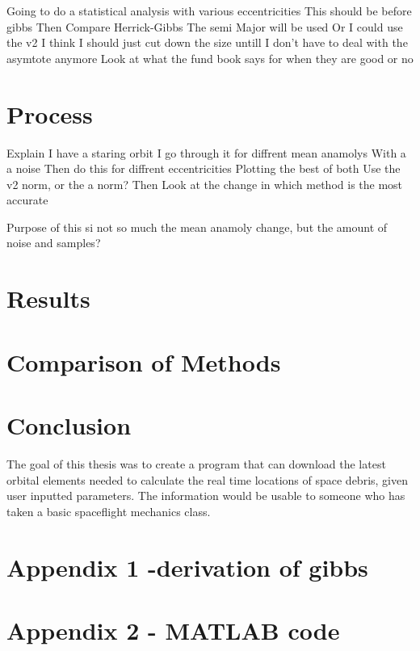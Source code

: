 \documentclass[12pt]{article}
\begin{document}
	
	Going to do a statistical analysis with various eccentricities
	This should be before gibbs
	Then Compare Herrick-Gibbs
	The semi Major will be used
	Or I could use the v2
	I think I should just cut down the size untill I don't have to deal with the asymtote anymore
	Look at what the fund book says for when they are good or no
	
	\section{Process}
	Explain I have a staring orbit
	I go through it for diffrent mean anamolys
	With a a noise
	Then do this for diffrent eccentricities
	Plotting the best of both
	Use the v2 norm, or the a norm?
	Then Look at the change in which method is the most accurate
	
	Purpose of this si not so much the mean anamoly change, but the amount of noise and samples?
	\fi
	\section{Results}
	
	\section{Comparison of Methods}
	
	\section{Conclusion}
	The goal of this thesis was to create a program that can download the latest orbital elements needed to calculate the real time locations of space debris, given user inputted parameters. The information would be usable to someone who has taken a basic spaceflight mechanics class. 
	

	
		
		
		
		

		
		\newpage
		\singlespacing
		\section*{Appendix 1 -derivation of gibbs}
		\section*{Appendix 2 - MATLAB code}
		
\end{document}
